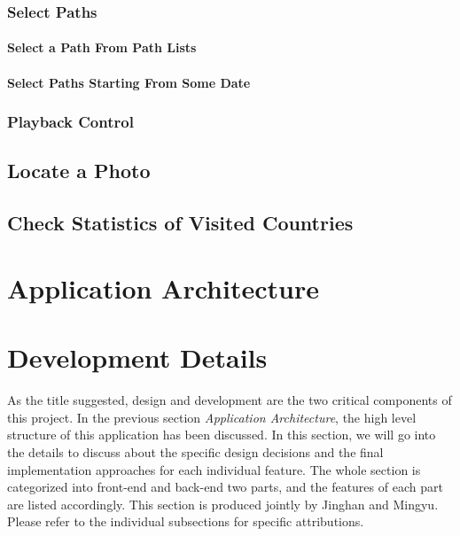 \documentclass[12pt,a4paper]{article}
\begin{document}
            \subsubsection{Select Paths}
                \paragraph{Select a Path From Path Lists}
                \paragraph{Select Paths Starting From Some Date}
            \subsubsection{Playback Control}
        \subsection{Locate a Photo} %
        \subsection{Check Statistics of Visited Countries} %
    \clearpage    
    
    
    \section{Application Architecture} %
    \clearpage
    
    \section{Development Details}
    
    As the title suggested, design and development are the two critical components of this project. In the previous section \textit{Application Architecture}, the high level structure of this application has been discussed. In this section, we will go into the details to discuss about the specific design decisions and the final implementation approaches for each individual feature. The whole section is categorized into front-end and back-end two parts, and the features of each part are listed accordingly. This section is produced jointly by Jinghan and Mingyu. Please refer to the individual subsections for specific attributions.
        
\end{document}
